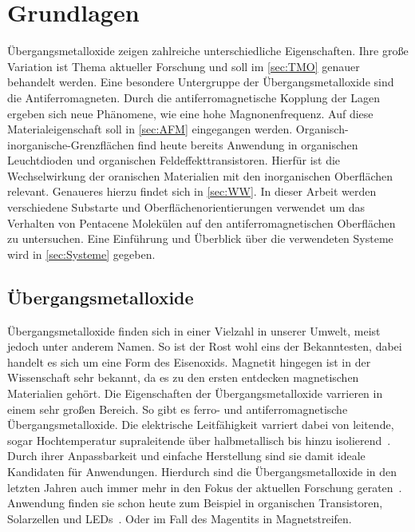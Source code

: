 \chapter{Grundlagen}
    Übergangsmetalloxide zeigen zahlreiche unterschiedliche Eigenschaften.
    Ihre große Variation ist Thema aktueller Forschung und soll im \autoref{sec:TMO} genauer behandelt werden.
    Eine besondere Untergruppe der Übergangsmetalloxide sind die Antiferromagneten.
    Durch die antiferromagnetische Kopplung der Lagen ergeben sich neue Phänomene, wie eine hohe Magnonenfrequenz.
    Auf diese Materialeigenschaft soll in \autoref{sec:AFM} eingegangen werden.
    Organisch-inorganische-Grenzflächen find heute bereits Anwendung in organischen Leuchtdioden und organischen Feldeffekttransistoren.
    Hierfür ist die Wechselwirkung der oranischen Materialien mit den inorganischen Oberflächen relevant.
    Genaueres hierzu findet sich in \autoref{sec:WW}.
    In dieser Arbeit werden verschiedene Substarte und Oberflächenorientierungen verwendet um das Verhalten von Pentacene Molekülen auf den antiferromagnetischen Oberflächen zu untersuchen.
    Eine Einführung und Überblick über die verwendeten Systeme wird in \autoref{sec:Systeme} gegeben.
    

    \section{Übergangsmetalloxide} \label{sec:TMO}
        Übergangsmetalloxide finden sich in einer Vielzahl in unserer Umwelt, meist jedoch unter anderem Namen.
        So ist der Rost wohl eins der Bekanntesten, dabei handelt es sich um eine Form des Eisenoxids.
        Magnetit hingegen ist in der Wissenschaft sehr bekannt, da es zu den ersten entdecken magnetischen Materialien gehört.
        Die Eigenschaften der Übergangsmetalloxide varrieren in einem sehr großen Bereich.
        So gibt es ferro- und antiferromagnetische Übergangsmetalloxide.
        Die elektrische Leitfähigkeit varriert dabei von leitende, sogar Hochtemperatur supraleitende über halbmetallisch bis hinzu isolierend~\cite{IF_5}.
        Durch ihrer Anpassbarkeit und einfache Herstellung sind sie damit ideale Kandidaten für Anwendungen.
        Hierdurch sind die Übergangsmetalloxide in den letzten Jahren auch immer mehr in den Fokus der aktuellen Forschung geraten~\cite{IF_6, parkinson_iron_2016, cornell_iron_2003}.
        Anwendung finden sie schon heute zum Beispiel in organischen Transistoren, Solarzellen und LEDs~\cite{IF_3}.
        Oder im Fall des Magentits in Magnetstreifen.

